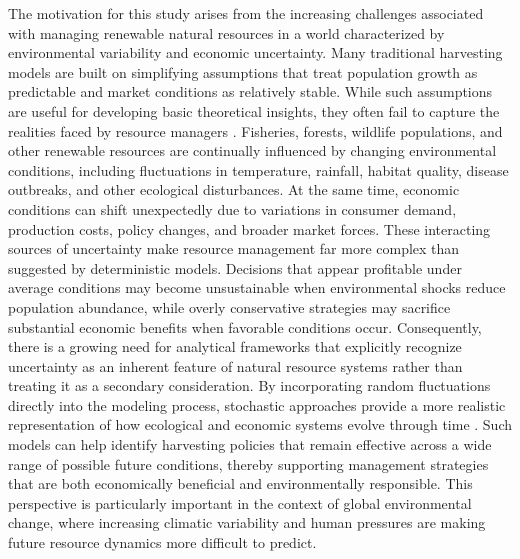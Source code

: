 \documentclass[11pt]{article}
\begin{document}
	The motivation for this study arises from the increasing challenges associated with managing renewable natural resources in a world characterized by environmental variability and economic uncertainty. Many traditional harvesting models are built on simplifying assumptions that treat population growth as predictable and market conditions as relatively stable. While such assumptions are useful for developing basic theoretical insights, they often fail to capture the realities faced by resource managers \citep{pramanik2024motivation,bulls2025assessing}. Fisheries, forests, wildlife populations, and other renewable resources are continually influenced by changing environmental conditions, including fluctuations in temperature, rainfall, habitat quality, disease outbreaks, and other ecological disturbances. At the same time, economic conditions can shift unexpectedly due to variations in consumer demand, production costs, policy changes, and broader market forces. These interacting sources of uncertainty make resource management far more complex than suggested by deterministic models. Decisions that appear profitable under average conditions may become unsustainable when environmental shocks reduce population abundance, while overly conservative strategies may sacrifice substantial economic benefits when favorable conditions occur. Consequently, there is a growing need for analytical frameworks that explicitly recognize uncertainty as an inherent feature of natural resource systems rather than treating it as a secondary consideration. By incorporating random fluctuations directly into the modeling process, stochastic approaches provide a more realistic representation of how ecological and economic systems evolve through time \citep{hertweck2023clinicopathological,khan2023myb}. Such models can help identify harvesting policies that remain effective across a wide range of possible future conditions, thereby supporting management strategies that are both economically beneficial and environmentally responsible. This perspective is particularly important in the context of global environmental change, where increasing climatic variability and human pressures are making future resource dynamics more difficult to predict.
	
\end{document}
